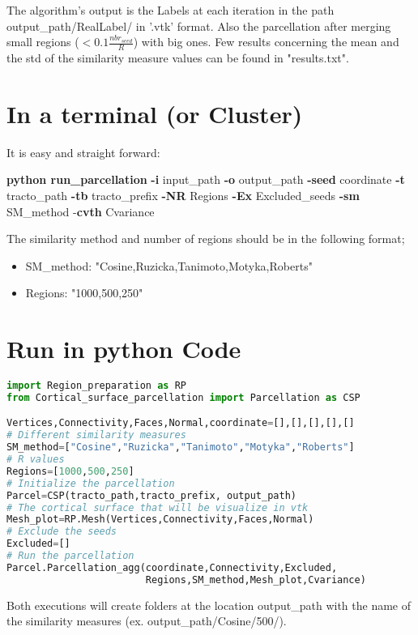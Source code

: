 \documentclass[a4paper,10pt]{article}
\begin{document}
 
The algorithm's output is the Labels at each iteration in the path output\_path/RealLabel/ in '.vtk' format. Also the parcellation after merging small regions ($<0.1\frac{nbr_{seed}}{R}$) with big ones.
Few results concerning the mean and the std of the similarity measure values can be found in "results.txt".

\section{In a terminal (or Cluster)}
It is easy and straight forward: 

\noindent \textbf{python run\_parcellation} \textbf{-i} input\_path \textbf{-o} output\_path \textbf{-seed} coordinate \textbf{-t} tracto\_path \textbf{-tb} tracto\_prefix \textbf{-NR} Regions \textbf{-Ex} Excluded\_seeds \textbf{-sm} SM\_method -\textbf{cvth} Cvariance

The similarity method and number of regions should be in the following format; 
\begin{itemize}
 \item SM\_method: "Cosine,Ruzicka,Tanimoto,Motyka,Roberts"
 \item Regions: "1000,500,250"
\end{itemize}


\section{Run in python Code}
\begin{lstlisting}[language=Python]
import Region_preparation as RP 
from Cortical_surface_parcellation import Parcellation as CSP

Vertices,Connectivity,Faces,Normal,coordinate=[],[],[],[],[]
# Different similarity measures
SM_method=["Cosine","Ruzicka","Tanimoto","Motyka","Roberts"]
# R values
Regions=[1000,500,250]
# Initialize the parcellation
Parcel=CSP(tracto_path,tracto_prefix, output_path)
# The cortical surface that will be visualize in vtk
Mesh_plot=RP.Mesh(Vertices,Connectivity,Faces,Normal)
# Exclude the seeds
Excluded=[]
# Run the parcellation
Parcel.Parcellation_agg(coordinate,Connectivity,Excluded,
                        Regions,SM_method,Mesh_plot,Cvariance)
\end{lstlisting}

\noindent Both executions will create folders at the location output\_path with the name of the similarity measures (ex. output\_path/Cosine/500/).
\end{document}
